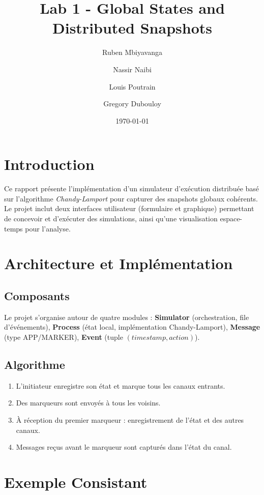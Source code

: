 \documentclass{article}
\title{Lab 1 - Global States and Distributed Snapshots}
\author{
  Ruben Mbiyavanga \and
  Nassir Naibi \and
  Louis Poutrain \and
  Gregory Dubouloy
}
\date{\today}
\begin{document}
\maketitle 

\tableofcontents 

\newpage

\section{Introduction}

Ce rapport présente l'implémentation d'un simulateur d'exécution distribuée basé sur l'algorithme \textit{Chandy-Lamport} pour capturer des snapshots globaux cohérents. Le projet inclut deux interfaces utilisateur (formulaire et graphique) permettant de concevoir et d'exécuter des simulations, ainsi qu'une visualisation espace-temps pour l'analyse.

\section{Architecture et Implémentation}

\subsection{Composants}

Le projet s'organise autour de quatre modules : \textbf{Simulator} (orchestration, file d'événements), \textbf{Process} (état local, implémentation Chandy-Lamport), \textbf{Message} (type APP/MARKER), \textbf{Event} (tuple $(timestamp, action)$).

\subsection{Algorithme}

\begin{enumerate}
    \item L'initiateur enregistre son état et marque tous les canaux entrants.
    \item Des marqueurs sont envoyés à tous les voisins.
    \item À réception du premier marqueur : enregistrement de l'état et des autres canaux.
    \item Messages reçus avant le marqueur sont capturés dans l'état du canal.
\end{enumerate}

\newpage

\section{Exemple Consistant}
\end{document}
